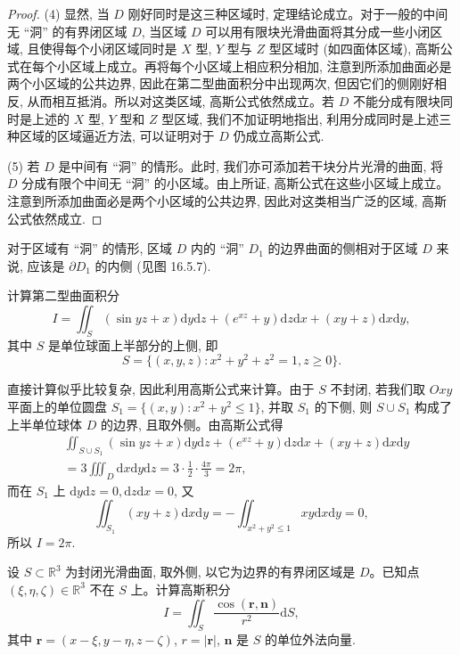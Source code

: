 \begin{proof}
(4) 显然, 当 $D$ 刚好同时是这三种区域时, 定理结论成立。对于一般的中间无 ``洞'' 的有界闭区域 $D$, 当区域 $D$ 可以用有限块光滑曲面将其分成一些小闭区域, 且使得每个小闭区域同时是 $X$ 型, $Y$ 型与 $Z$ 型区域时 (如四面体区域), 高斯公式在每个小区域上成立。再将每个小区域上相应积分相加, 注意到所添加曲面必是两个小区域的公共边界, 因此在第二型曲面积分中出现两次, 但因它们的侧刚好相反, 从而相互抵消。所以对这类区域, 高斯公式依然成立。若 $D$ 不能分成有限块同时是上述的 $X$ 型, $Y$ 型和 $Z$ 型区域, 我们不加证明地指出, 利用分成同时是上述三种区域的区域逼近方法, 可以证明对于 $D$ 仍成立高斯公式.

(5) 若 $D$ 是中间有 ``洞'' 的情形。此时, 我们亦可添加若干块分片光滑的曲面, 将 $D$ 分成有限个中间无 ``洞'' 的小区域。由上所证, 高斯公式在这些小区域上成立。注意到所添加曲面必是两个小区域的公共边界, 因此对这类相当广泛的区域, 高斯公式依然成立.
\end{proof}


\begin{remark}\label{remark:ma-16-source-51}
对于区域有 ``洞'' 的情形, 区域 $D$ 内的 ``洞'' $D_1$ 的边界曲面的侧相对于区域 $D$ 来说, 应该是 $\partial D_1$ 的内侧 (见图 16.5.7).
\end{remark}


\begin{example}\label{example:ma-16-5-3}
计算第二型曲面积分
\[
  I=\iint_S(\sin yz+x)\mathrm dy\mathrm dz+(e^{xz}+y)\mathrm dz\mathrm dx+(xy+z)\mathrm dx\mathrm dy,
\]
其中 $S$ 是单位球面上半部分的上侧, 即
\[
  S=\{(x,y,z):x^2+y^2+z^2=1,z\geqslant0\}.
\]
\end{example}


\begin{solve}
直接计算似乎比较复杂, 因此利用高斯公式来计算。由于 $S$ 不封闭, 若我们取 $Oxy$ 平面上的单位圆盘 $S_1=\{(x,y):x^2+y^2\leqslant1\}$, 并取 $S_1$ 的下侧, 则 $S\cup S_1$ 构成了上半单位球体 $D$ 的边界, 且取外侧。由高斯公式得
\[
\begin{aligned}
  &\iint_{S\cup S_1}(\sin yz+x)\mathrm dy\mathrm dz+(e^{xz}+y)\mathrm dz\mathrm dx+(xy+z)\mathrm dx\mathrm dy\\
  &=3\iiint_D\mathrm dx\mathrm dy\mathrm dz
    =3\cdot\frac12\cdot\frac{4\pi}{3}=2\pi,
\end{aligned}
\]
而在 $S_1$ 上 $\mathrm dy\mathrm dz=0,\mathrm dz\mathrm dx=0$, 又
\[
  \iint_{S_1}(xy+z)\mathrm dx\mathrm dy
  =-\iint_{x^2+y^2\leqslant1}xy\mathrm dx\mathrm dy=0,
\]
所以 $I=2\pi$.
\end{solve}


\begin{example}\label{example:ma-16-5-4}
设 $S\subset\mathbb R^3$ 为封闭光滑曲面, 取外侧, 以它为边界的有界闭区域是 $D$。已知点 $(\xi,\eta,\zeta)\in\mathbb R^3$ 不在 $S$ 上。计算高斯积分
\[
  I=\iint_S\frac{\cos(\boldsymbol r,\boldsymbol n)}{r^2}\mathrm dS,
\]
其中 $\boldsymbol r=(x-\xi,y-\eta,z-\zeta)$, $r=|\boldsymbol r|$, $\boldsymbol n$ 是 $S$ 的单位外法向量.
\end{example}


